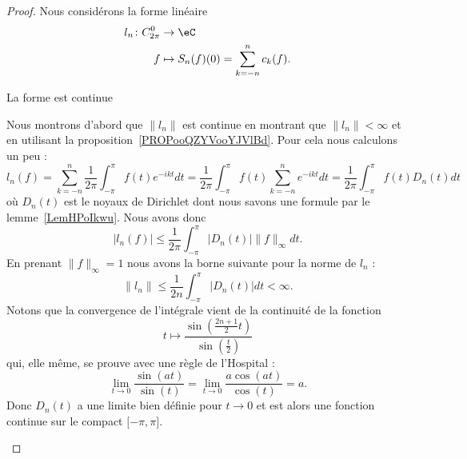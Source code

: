 \begin{proof}
    Nous considérons la forme linéaire
    \begin{equation}
        \begin{aligned}
            l_n\colon C^0_{2\pi}&\to \eC \\
            f&\mapsto S_n(f)(0)=\sum_{k=-n}^nc_k(f).
        \end{aligned}
    \end{equation}
    \begin{subproof}
        \item[La forme est continue]

            Nous montrons d'abord que \( \| l_n \|\) est continue en montrant que \( \| l_n \|<\infty\) et en utilisant la proposition~\ref{PROPooQZYVooYJVlBd}. Pour cela nous calculons un peu :
            \begin{equation}    \label{EqBELHGya}
                l_n(f)=\sum_{k=-n}^n\frac{1}{ 2\pi }\int_{-\pi}^{\pi}f(t) e^{-ikt}dt=\frac{1}{ 2\pi }\int_{-\pi}^{\pi}f(t)\sum_{k=-n}^n e^{-ikt}dt=\frac{1}{ 2\pi }\int_{-\pi}^{\pi}f(t)D_n(t)dt
            \end{equation}
            où \( D_n(t)\) est le noyaux de Dirichlet dont nous savons une formule par le lemme~\ref{LemHPoIkwu}. Nous avons donc
            \begin{equation}
                | l_n(f) |\leq \frac{1}{ 2\pi }\int_{-\pi}^{\pi}| D_n(t) |\| f \|_{\infty}dt.
            \end{equation}
            En prenant \( \| f \|_{\infty}=1\) nous avons la borne suivante pour la norme de \( l_n\) :
            \begin{equation}        \label{EqBXoIUiD}
                \| l_n \|\leq \frac{1}{ 2n }\int_{-\pi}^{\pi}| D_n(t) |dt<\infty.
            \end{equation}
            Notons que la convergence de l'intégrale vient de la continuité de la fonction
            \begin{equation}
                t\mapsto \frac{ \sin\left( \frac{ 2n+1 }{2}t \right) }{ \sin\left( \frac{ t }{ 2 } \right) }
            \end{equation}
            qui, elle même, se prouve avec une règle de l'Hospital :
            \begin{equation}
                \lim_{t\to 0} \frac{ \sin(at) }{ \sin(t) }=\lim_{t\to 0} \frac{ a\cos(at) }{ \cos(t) }=a.
            \end{equation}
            Donc \( D_n(t)\) a une limite bien définie pour \( t\to 0\) et est alors une fonction continue sur le compact \( \mathopen[ -\pi , \pi \mathclose]\).


\end{subproof}
\end{proof}
